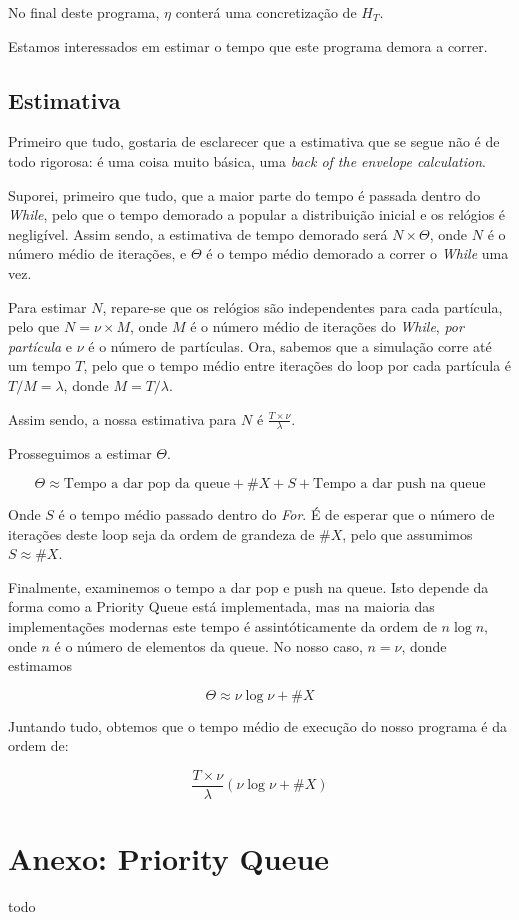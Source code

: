 \documentclass{article}
\begin{document}
	No final deste programa, $\eta$ conterá uma concretização de $H_T$.
	
	Estamos interessados em estimar o tempo que este programa demora a correr.
	
	\subsection{Estimativa}
	
	Primeiro que tudo, gostaria de esclarecer que a estimativa que se segue não é de todo rigorosa: é uma coisa muito básica, uma \emph{back of the envelope calculation}.
	
	Suporei, primeiro que tudo, que a maior parte do tempo é passada dentro do \emph{While}, pelo que o tempo demorado a popular a distribuição inicial e os relógios é negligível. Assim sendo, a estimativa de tempo demorado será $N \times \Theta$, onde $N$ é o número médio de iterações, e $\Theta$ é o tempo médio demorado a correr o \emph{While} uma vez.
	
	Para estimar $N$, repare-se que os relógios são independentes para cada partícula, pelo que $N = \nu \times M$, onde $M$ é o número médio de iterações do \emph{While}, \emph{por partícula} e $\nu$ é o número de partículas. Ora, sabemos que a simulação corre até um tempo $T$, pelo que o tempo médio entre iterações do loop por cada partícula é $T/M = \lambda$, donde $M = T/\lambda$.
	
	Assim sendo, a nossa estimativa para $N$ é $\frac{T \times \nu}\lambda$.
	
	Prosseguimos a estimar $\Theta$.
	
	\[\Theta \approx \text{Tempo a dar pop da queue} + \#X + S + \text{Tempo a dar push na queue}\]
	
	Onde $S$ é o tempo médio passado dentro do \emph{For}. É de esperar que o número de iterações deste loop seja da ordem de grandeza de $\#X$, pelo que assumimos $S \approx \#X$.
	
	Finalmente, examinemos o tempo a dar pop e push na queue. Isto depende da forma como a Priority Queue está implementada, mas na maioria das implementações modernas este tempo é assintóticamente da ordem de $n \log n$, onde $n$ é o número de elementos da queue. No nosso caso, $n = \nu$, donde estimamos
	
	\[\Theta \approx \nu \log \nu + \#X\]
	
	Juntando tudo, obtemos que o tempo médio de execução do nosso programa é da ordem de:
	
	\[\frac{T \times \nu}\lambda (\nu \log \nu + \#X)\]
	
	\section{Anexo: Priority Queue}
	
	todo
\end{document}
